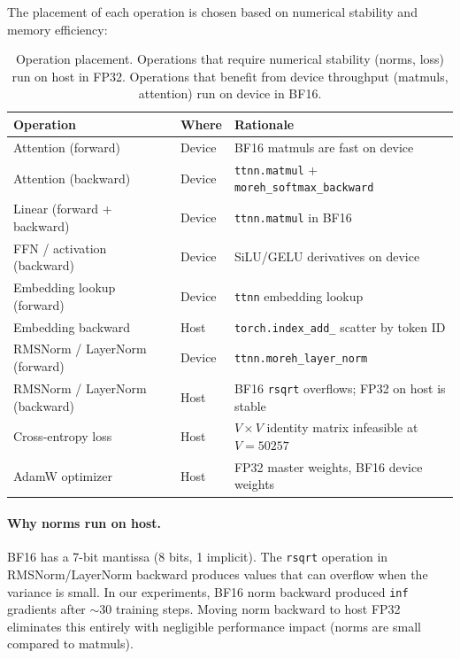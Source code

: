 \documentclass[11pt,a4paper]{article}
\begin{document}
The placement of each operation is chosen based on numerical stability and memory efficiency:

\begin{table}[h]
\centering
\small
\begin{tabularx}{\textwidth}{p{} p{} p{}}
\toprule
\textbf{Operation} & \textbf{Where} & \textbf{Rationale} \\
\midrule
Attention (forward) & Device & BF16 matmuls are fast on device \\
Attention (backward) & Device & \texttt{ttnn.matmul} + \texttt{moreh\_softmax\_backward} \\
Linear (forward + backward) & Device & \texttt{ttnn.matmul} in BF16 \\
FFN / activation (backward) & Device & SiLU/GELU derivatives on device \\
Embedding lookup (forward) & Device & \texttt{ttnn} embedding lookup \\
Embedding backward & Host & \texttt{torch.index\_add\_} scatter by token ID \\
RMSNorm / LayerNorm (forward) & Device & \texttt{ttnn.moreh\_layer\_norm} \\
RMSNorm / LayerNorm (backward) & Host & BF16 \texttt{rsqrt} overflows; FP32 on host is stable \\
Cross-entropy loss & Host & $V \times V$ identity matrix infeasible at $V{=}50257$ \\
AdamW optimizer & Host & FP32 master weights, BF16 device weights \\
\bottomrule
\end{tabularx}
\caption{Operation placement. Operations that require numerical stability (norms, loss) run on host in FP32. Operations that benefit from device throughput (matmuls, attention) run on device in BF16.}
\label{tab:op-placement}
\end{table}

\paragraph{Why norms run on host.}
BF16 has a 7-bit mantissa (8 bits, 1 implicit). The \texttt{rsqrt} operation in RMSNorm/LayerNorm backward produces values that can overflow when the variance is small. In our experiments, BF16 norm backward produced \texttt{inf} gradients after $\sim$30 training steps. Moving norm backward to host FP32 eliminates this entirely with negligible performance impact (norms are small compared to matmuls).
\end{document}
